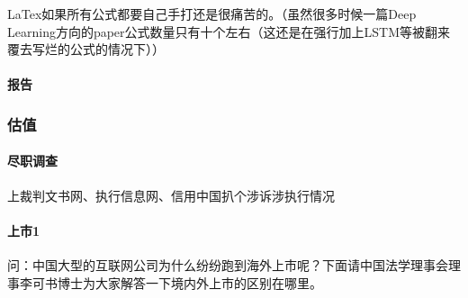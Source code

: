 \documentclass[letterpaper,10pt,english]{sphinxmanual}
\begin{document}
LaTex如果所有公式都要自己手打还是很痛苦的。（虽然很多时候一篇Deep
Learning方向的paper公式数量只有十个左右（这还是在强行加上LSTM等被翻来覆去写烂的公式的情况下））



\paragraph{报告}
\label{\detokenize{chapter_knowledge/research:id11}}


\subsubsection{估值}
\label{\detokenize{chapter_knowledge/Valuation:id1}}\label{\detokenize{chapter_knowledge/Valuation::doc}}

\paragraph{尽职调查}
\label{\detokenize{chapter_knowledge/Valuation:id2}}
上裁判文书网、执行信息网、信用中国扒个涉诉涉执行情况


\paragraph{上市1\sphinxfootnotemark[684]}
\label{\detokenize{chapter_knowledge/Valuation:id3}}%
\begin{footnotetext}[684]\sphinxAtStartFootnote
{}
%
\end{footnotetext}\ignorespaces 
问：中国大型的互联网公司为什么纷纷跑到海外上市呢？下面请中国法学理事会理事李可书博士为大家解答一下境内外上市的区别在哪里。
\end{document}
